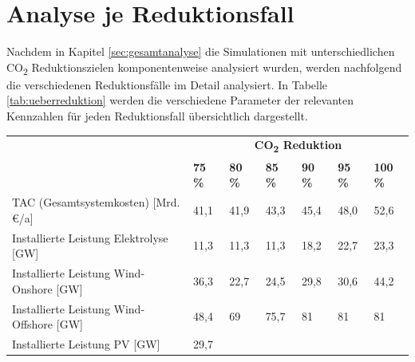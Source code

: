 \section{Analyse je Reduktionsfall}
\label{sec:reduktionsfaelle}
Nachdem in Kapitel \ref{sec:gesamtanalyse} die Simulationen mit unterschiedlichen CO\textsubscript{2} Reduktionszielen komponentenweise analysiert wurden, werden nachfolgend die verschiedenen Reduktionsfälle im Detail analysiert. In Tabelle \ref{tab:ueberreduktion} werden die verschiedene Parameter der relevanten Kennzahlen für jeden Reduktionsfall übersichtlich dargestellt.




\begin{table}[!ht]
    \centering
    \footnotesize	
    \begin{tabular}{|l|llllll|}
    \hline
     &
      \multicolumn{6}{c|}{\textbf{CO\textsubscript{2} Reduktion}} \\ \cline{2-7} 
     &
      \multicolumn{1}{l|}{\textbf{75 \%}} &
      \multicolumn{1}{l|}{\textbf{80 \%}} &
      \multicolumn{1}{l|}{\textbf{85 \%}} &
      \multicolumn{1}{l|}{\textbf{90 \%}} &
      \multicolumn{1}{l|}{\textbf{95 \%}} &
      \textbf{100 \%} \\ \hline
    {TAC (Gesamtsystemkosten) {[}Mrd. €/a{]}} &
      \multicolumn{1}{l|}{41,1} &
      \multicolumn{1}{l|}{41,9} &
      \multicolumn{1}{l|}{43,3} &
      \multicolumn{1}{l|}{45,4} &
      \multicolumn{1}{l|}{48,0} &
      52,6 \\ \hline
    {Installierte Leistung Elektrolyse {[}GW{]}} &
      \multicolumn{1}{l|}{11,3} &
      \multicolumn{1}{l|}{11,3} &
      \multicolumn{1}{l|}{11,3} &
      \multicolumn{1}{l|}{18,2} &
      \multicolumn{1}{l|}{22,7} &
      23,3 \\ \hline
    {Installierte Leistung Wind-Onshore {[}GW{]}} &
      \multicolumn{1}{l|}{36,3} &
      \multicolumn{1}{l|}{22,7} &
      \multicolumn{1}{l|}{24,5} &
      \multicolumn{1}{l|}{29,8} &
      \multicolumn{1}{l|}{30,6} &
      44,2 \\ \hline
    {Installierte Leistung Wind-Offshore {[}GW{]}} &
      \multicolumn{1}{l|}{48,4} &
      \multicolumn{1}{l|}{69} &
      \multicolumn{1}{l|}{75,7} &
      \multicolumn{1}{l|}{81} &
      \multicolumn{1}{l|}{81} &
      81 \\ \hline
    {Installierte Leistung PV {[}GW{]}} &
      \multicolumn{1}{l|}{29,7} &

\end{tabular}
\end{table}
